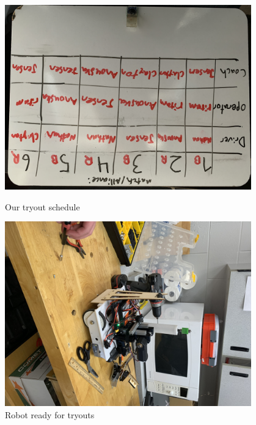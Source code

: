  

\begin{figure}[ht]
\centering
\begin{minipage}[b]{.48\textwidth}
  \centering
  \includegraphics[width=0.95\textwidth]{Meetings/November/11-04-21/11-4-21_Team_Figure1 - Nathan Forrer.JPG}
  \caption{Our tryout schedule}
  \label{fig:110421_1}
\end{minipage}%
\hfill%
\begin{minipage}[b]{.48\textwidth}
  \centering
  \includegraphics[width=0.95\textwidth]{Meetings/November/11-04-21/11-4-21_Team_Figure2 - Nathan Forrer.JPG}
  \caption{Robot ready for tryouts}
  \label{fig:110421_2}
\end{minipage}
\end{figure}

